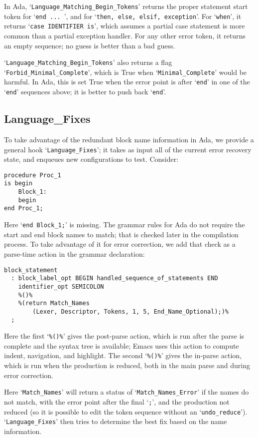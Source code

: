 \documentclass{article}
\newcommand{\code}[1]{`{\tt #1}'}
\begin{document}
In Ada, \code{Language\_Matching\_Begin\_Tokens} returns the proper
statement start token for \code{end ... }, and for
\code{then, else, elsif, exception}. For \code{when}, it returns
\code{case IDENTIFIER is}, which assumes a partial case statement is
more common than a partial exception handler. For any other error
token, it returns an empty sequence; no guess is better than a bad
guess.

\code{Language\_Matching\_Begin\_Tokens} also returns a flag
\code{Forbid\_Minimal\_Complete}, which is True when
\code{Minimal\_Complete} would be harmful. In Ada, this is set True
when the error point is after \code{end} in one of the \code{end}
sequences above; it is better to push back \code{end}.

\subsection{Language\_Fixes}
To take advantage of the redundant block name information in Ada, we
provide a general hook \code{Language\_Fixes}; it takes as input all of
the current error recovery state, and enqueues new configurations to
test.
Consider:
\begin{verbatim}
procedure Proc_1
is begin
    Block_1:
    begin
end Proc_1;
\end{verbatim}
\caption{}
Here \code{end Block\_1;} is missing. The grammar rules for Ada do not
require the start and end block names to match; that is checked later
in the compilation process. To take advantage of it for error
correction, we add that check as a parse-time action in the grammar
declaration:
\begin{verbatim}
block_statement
  : block_label_opt BEGIN handled_sequence_of_statements END
    identifier_opt SEMICOLON
    %()%
    %(return Match_Names
        (Lexer, Descriptor, Tokens, 1, 5, End_Name_Optional);)%
  ;
\end{verbatim}
Here the first `\verb|%()%|' gives the post-parse action, which is run
after the parse is complete and the syntax tree is available; Emacs
uses this action to compute indent, navigation, and highlight. The
second `\verb|%()%|' gives the in-parse action, which is run when the
production is reduced, both in the main parse and during error
correction.

Here \code{Match\_Names} will return a status of
\code{Match\_Names\_Error} if the names do not match, with the error
point after the final \code{;}, and the production not reduced (so it
is possible to edit the token sequence without an
\code{undo\_reduce}). \code{Language\_Fixes} then tries to determine
the best fix based on the name information.
\end{document}
